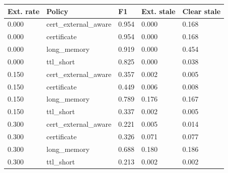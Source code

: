 \begin{tabular}{lllll}
\toprule
Ext. rate & Policy & F1 & Ext. stale & Clear stale \\
\midrule
0.000 & cert\_external\_aware & 0.954 & 0.000 & 0.168 \\
0.000 & certificate & 0.954 & 0.000 & 0.168 \\
0.000 & long\_memory & 0.919 & 0.000 & 0.454 \\
0.000 & ttl\_short & 0.825 & 0.000 & 0.038 \\
0.150 & cert\_external\_aware & 0.357 & 0.002 & 0.005 \\
0.150 & certificate & 0.449 & 0.006 & 0.008 \\
0.150 & long\_memory & 0.789 & 0.176 & 0.167 \\
0.150 & ttl\_short & 0.337 & 0.002 & 0.005 \\
0.300 & cert\_external\_aware & 0.221 & 0.005 & 0.014 \\
0.300 & certificate & 0.326 & 0.071 & 0.077 \\
0.300 & long\_memory & 0.688 & 0.180 & 0.186 \\
0.300 & ttl\_short & 0.213 & 0.002 & 0.002 \\
\bottomrule
\end{tabular}
